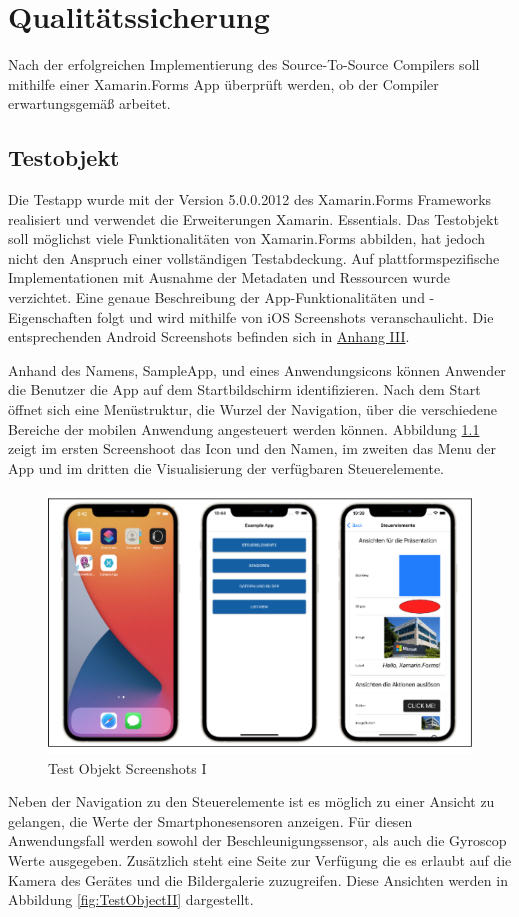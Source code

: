 \chapter{Qualitätssicherung}
\label{chap:Qualitätssicherung}

Nach der erfolgreichen Implementierung des Source-To-Source Compilers soll mithilfe einer Xamarin.Forms App überprüft werden,  ob der Compiler erwartungsgemäß arbeitet.  

\section{Testobjekt}
Die Testapp wurde mit der Version 5.0.0.2012 des Xamarin.Forms Frameworks realisiert und verwendet die Erweiterungen Xamarin. Essentials.  Das Testobjekt soll möglichst viele Funktionalitäten von Xamarin.Forms abbilden, hat jedoch nicht den Anspruch einer vollständigen Testabdeckung.
Auf plattformspezifische Implementationen mit Ausnahme der Metadaten und Ressourcen wurde verzichtet.  Eine genaue Beschreibung der App-Funktionalitäten und -Eigenschaften folgt und wird mithilfe von iOS Screenshots veranschaulicht.  Die entsprechenden Android Screenshots befinden sich in \hyperref[chap:AnhangAndroidScreenshots]{Anhang III}.

Anhand des Namens,  SampleApp,  und eines Anwendungsicons können Anwender die Benutzer die App auf dem Startbildschirm identifizieren.  Nach dem Start öffnet sich eine Menüstruktur,  die Wurzel der Navigation, über die verschiedene Bereiche der mobilen Anwendung angesteuert werden können.  Abbildung \ref{fig:TestObjectI} zeigt im ersten Screenshoot das Icon und den Namen,  im zweiten das Menu der App und im dritten die Visualisierung der verfügbaren Steuerelemente.

\newpage
\begin{figure}[!ht]
 \includegraphics[width=\textwidth,keepaspectratio]{Images/Screenshot/AppIconAndMenu.png}
 \caption{Test Objekt Screenshots I}
 \label{fig:TestObjectI}
\end{figure}
Neben der Navigation zu den Steuerelemente ist es  möglich zu einer Ansicht zu gelangen,  die 
 Werte der Smartphonesensoren anzeigen. Für diesen Anwendungsfall werden sowohl der Beschleunigungssensor,  als auch die Gyroscop Werte ausgegeben.
 Zusätzlich steht eine Seite zur Verfügung die es erlaubt auf die Kamera des Gerätes und die Bildergalerie zuzugreifen.  Diese Ansichten werden in Abbildung \ref{fig:TestObjectII} dargestellt.


